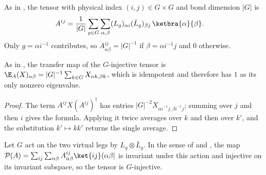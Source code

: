 \begin{definition}\label{def:ghz_g_injective_tensor}
    \leanok
    As in \cite[Section~III.A, ``Virtual symmetries'']{Cirac2021Matrix}, the
    tensor with physical index $(i,j)\in G\times G$ and bond dimension $|G|$
    is
    \begin{align}
        A^{ij} & =\frac{1}{|G|}\sum_{g\in G}\sum_{\alpha,\beta}
        (L_g)_{\alpha i}(\bar L_g)_{\beta j}\,\ketbra{\alpha}{\beta}.
        \notag
    \end{align}
    Only $g=\alpha i^{-1}$ contributes, so $A^{ij}_{\alpha\beta}=|G|^{-1}$ if
    $\beta=\alpha i^{-1}j$ and $0$ otherwise.
\end{definition}

\begin{lemma}%
    \label{thm:ghz_g_injective_rfp}
    \leanok
    As in \cite[Section~III.A, ``Virtual symmetries'']{Cirac2021Matrix}, the
    transfer map of the $G$-injective tensor is
    $\E_A(X)_{\alpha\beta}=|G|^{-1}\sum_{k\in G}X_{\alpha k,\beta k}$, which is
    idempotent and therefore has $1$ as its only nonzero eigenvalue.
\end{lemma}

\begin{proof}\leanok
    The term $A^{ij}X(A^{ij})^\dagger$ has entries
    $|G|^{-2}X_{\alpha i^{-1}j,\beta i^{-1}j}$; summing over $j$ and then $i$
    gives the formula. Applying it twice averages over $k$ and then over
    $k'$, and the substitution $k'\mapsto kk'$ returns the single average.
\end{proof}

\begin{lemma}[$G$-injectivity]\label{thm:ghz_g_injective}
    \leanok
    Let $G$ act on the two virtual legs by $L_g\otimes\bar L_g$. In the sense
    of \cite[Section~III.A, ``Virtual symmetries'']{Cirac2021Matrix} and
    \cite[Section~``Two dimensions: $G$-injective PEPS'']{Schuch2010PEPS}, the
    map $\mathcal P(A)=\sum_{ij}\sum_{\alpha\beta}A^{ij}_{\alpha\beta}
        \ket{ij}(\alpha\beta|$ is invariant under this action and injective on
    its invariant subspace, so the tensor is $G$-injective.
\end{lemma}

